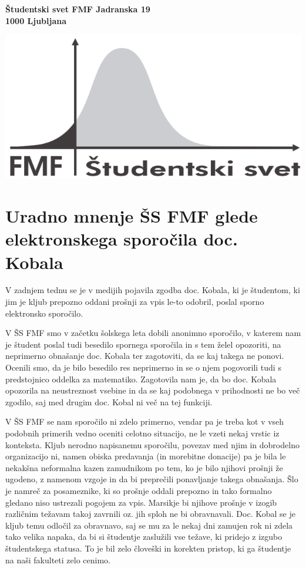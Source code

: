 \documentclass[a4paper,oneside,12pt]{article}
\title{\Title}
\author{\Author}
\date{\today}
\theoremstyle{definition}
\begin{document}
\noindent \parbox{9cm}{
  {\bf \v{S}tudentski svet FMF
    Jadranska 19\\
    1000 Ljubljana
  }}
  \hfill\parbox{5.5cm}
  {\includegraphics[scale=0.7]{Slyka}
  }

\vspace{20pt}

\section*{Uradno mnenje ŠS FMF glede \\ elektronskega sporočila doc. Kobala}

V zadnjem tednu se je v medijih pojavila zgodba doc. Kobala, ki je študentom, ki jim je kljub prepozno oddani prošnji za vpis le-to odobril, poslal sporno elektronsko sporočilo.

V ŠS FMF smo v začetku šolskega leta dobili anonimno sporočilo, v katerem nam je študent poslal tudi besedilo spornega sporočila in s tem želel opozoriti, na neprimerno obnašanje doc. Kobala ter zagotoviti, da se kaj takega ne ponovi. Ocenili smo, da je bilo besedilo res neprimerno in se o njem pogovorili tudi s predstojnico oddelka za matematiko. Zagotovila nam je, da bo doc. Kobala opozorila na neustreznost vsebine in da se kaj podobnega v prihodnosti ne bo več zgodilo, saj med drugim doc. Kobal ni več na tej funkciji.

V ŠS FMF se nam sporočilo ni zdelo primerno, vendar pa je treba kot v vseh podobnih primerih vedno oceniti celotno situacijo, ne le vzeti nekaj vrstic iz konteksta. Kljub nerodno napisanemu sporočilu, povezav med njim in dobrodelno organizacijo ni, namen obiska predavanja (in morebitne donacije) pa je bila le nekakšna neformalna kazen zamudnikom po tem, ko je bilo njihovi prošnji že ugodeno, z namenom vzgoje in da bi preprečili ponavljanje takega obnašanja. Šlo je namreč za posameznike, ki so prošnje oddali prepozno in tako formalno gledano niso ustrezali pogojem za vpis. Marsikje bi njihove prošnje v izogib različnim težavam takoj zavrnili oz. jih sploh ne bi obravnavali. Doc. Kobal se je kljub temu odločil za obravnavo, saj se mu za le nekaj dni zamujen rok ni zdela tako velika napaka, da bi si študentje zaslužili vse težave, ki pridejo z izgubo študentskega statusa. To je bil zelo človeški in korekten pristop, ki ga študentje na naši fakulteti zelo cenimo.
\end{document}
